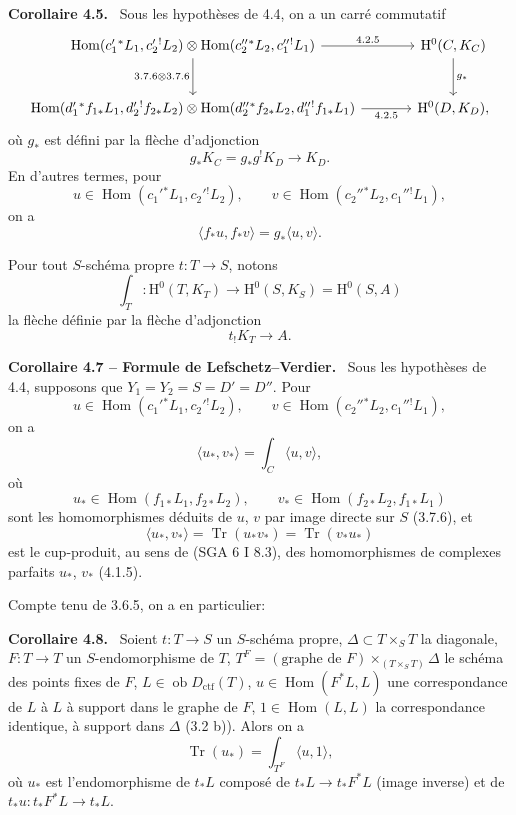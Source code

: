 \documentclass[11pt]{article}
\newenvironment{statement}[1]{\par\medskip\noindent\textbf{#1.}\ }{\par\medskip}
\renewcommand{\H}{\mathrm{H}}
\DeclareMathOperator{\Hom}{Hom}
\newcommand{\ob}{\operatorname{ob}}
\providecommand{\Dctf}{D_{\mathrm{ctf}}}
\providecommand{\Tr}{\operatorname{Tr}}
\providecommand{\Tr}{\operatorname{Tr}}
\providecommand{\Dctf}{D_{\mathrm{ctf}}}
\providecommand{\Tr}{\operatorname{Tr}}
\providecommand{\Hom}{\operatorname{Hom}}
\providecommand{\ob}{\operatorname{ob}}
\providecommand{\Tr}{\operatorname{Tr}}
\begin{document}
\begin{statement}{Corollaire 4.5}
Sous les hypothèses de 4.4, on a un carré commutatif
\[
\begin{tikzcd}[column sep=large,row sep=large]
\Hom(c_1'{}^*L_1,c_2'{}^!L_2)\otimes
\Hom(c_2''{}^*L_2,c_1''{}^!L_1)
 \arrow[r,"4.2.5"] \arrow[d,"3.7.6\otimes 3.7.6"'] &
\H^0(C,K_C)\arrow[d,"g_*"]\\
\Hom(d_1'{}^*f_{1*}L_1,d_2'{}^!f_{2*}L_2)\otimes
\Hom(d_2''{}^*f_{2*}L_2,d_1''{}^!f_{1*}L_1)
 \arrow[r,"4.2.5"'] &
\H^0(D,K_D),
\end{tikzcd}
\]
où $g_*$ est défini par la flèche d'adjonction
\[
g_*K_C=g_*g^!K_D\longrightarrow K_D.
\]
En d'autres termes, pour
\[
u\in\Hom(c_1'{}^*L_1,c_2'{}^!L_2),\qquad
v\in\Hom(c_2''{}^*L_2,c_1''{}^!L_1),
\]
on a
\begin{equation}
\tag{4.5.1}
\langle f_*u,f_*v\rangle=g_*\langle u,v\rangle.
\end{equation}
\end{statement}

Pour tout $S$-schéma propre $t:T\longrightarrow S$, notons
\begin{equation}
\tag{4.6}
\int_T:\H^0(T,K_T)\longrightarrow \H^0(S,K_S)=\H^0(S,A)
\end{equation}
la flèche définie par la flèche d'adjonction
\[
t_!K_T\longrightarrow A.
\]

\begin{statement}{Corollaire 4.7 -- Formule de Lefschetz--Verdier}
Sous les hypothèses de 4.4, supposons que $Y_1=Y_2=S=D'=D''$. Pour
\[
u\in\Hom(c_1'{}^*L_1,c_2'{}^!L_2),\qquad
v\in\Hom(c_2''{}^*L_2,c_1''{}^!L_1),
\]
on a
\begin{equation}
\tag{4.7.1}
\langle u_*,v_*\rangle=\int_C\langle u,v\rangle,
\end{equation}
où
\[
u_*\in\Hom(f_{1*}L_1,f_{2*}L_2),\qquad
v_*\in\Hom(f_{2*}L_2,f_{1*}L_1)
\]
sont les homomorphismes déduits de $u$, $v$ par image directe sur $S$ (3.7.6), et
\[
\langle u_*,v_*\rangle=\Tr(u_*v_*)=\Tr(v_*u_*)
\]
est le cup-produit, au sens de (SGA 6 I 8.3), des homomorphismes de complexes parfaits $u_*$, $v_*$ (4.1.5).
\end{statement}

Compte tenu de 3.6.5, on a en particulier:

\begin{statement}{Corollaire 4.8}
Soient $t:T\longrightarrow S$ un $S$-schéma propre, $\Delta\subset T\times_S T$ la diagonale, $F:T\longrightarrow T$ un $S$-endomorphisme de $T$, $T^F=(\text{graphe de }F)\times_{(T\times_S T)}\Delta$ le schéma des points fixes de $F$, $L\in\ob\Dctf(T)$, $u\in\Hom(F^*L,L)$ une correspondance de $L$ à $L$ à support dans le graphe de $F$, $1\in\Hom(L,L)$ la correspondance identique, à support dans $\Delta$ (3.2 b)). Alors on a
\[
\Tr(u_*)=\int_{T^F}\langle u,1\rangle,
\]
où $u_*$ est l'endomorphisme de $t_*L$ composé de $t_*L\longrightarrow t_*F^*L$ (image inverse) et de $t_*u:t_*F^*L\longrightarrow t_*L$.
\end{statement}
\end{document}
